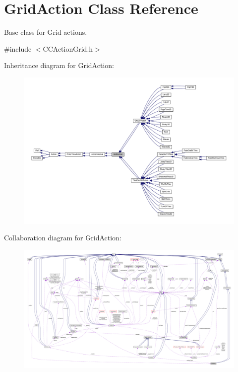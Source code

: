 \hypertarget{classGridAction}{}\section{Grid\+Action Class Reference}
\label{classGridAction}


Base class for Grid actions.  




{\ttfamily \#include $<$C\+C\+Action\+Grid.\+h$>$}



Inheritance diagram for Grid\+Action\+:
\nopagebreak
\begin{figure}[H]
\begin{center}
\leavevmode
\includegraphics[width=350pt]{classGridAction__inherit__graph}
\end{center}
\end{figure}


Collaboration diagram for Grid\+Action\+:
\nopagebreak
\begin{figure}[H]
\begin{center}
\leavevmode
\includegraphics[width=350pt]{classGridAction__coll__graph}
\end{center}
\end{figure}

